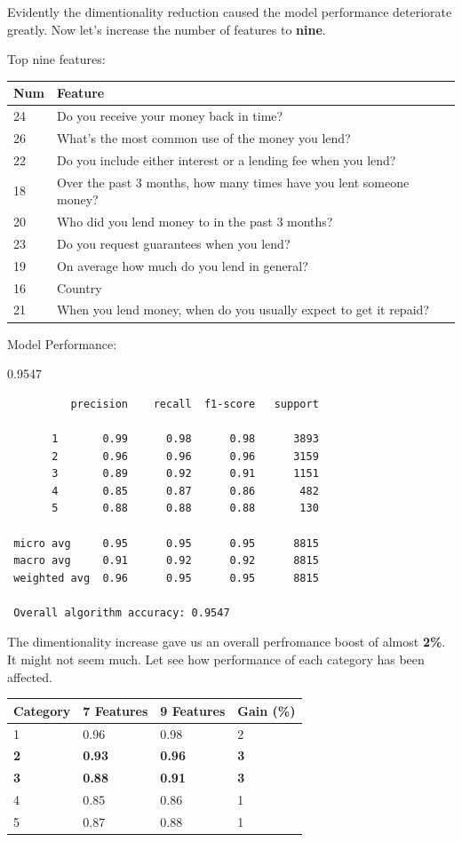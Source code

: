 Evidently the dimentionality reduction caused the model performance
deteriorate greatly. Now let's increase the number of features to
\textbf{nine}.

Top nine features:

\begin{longtable}[]{@{}ll@{}}
\toprule
Num & Feature\tabularnewline
\midrule
\endhead
24 & Do you receive your money back in time?\tabularnewline
26 & What's the most common use of the money you lend?\tabularnewline
22 & Do you include either interest or a lending fee when you
lend?\tabularnewline
18 & Over the past 3 months, how many times have you lent someone
money?\tabularnewline
20 & Who did you lend money to in the past 3 months?\tabularnewline
23 & Do you request guarantees when you lend?\tabularnewline
19 & On average how much do you lend in general?\tabularnewline
16 & Country\tabularnewline
21 & When you lend money, when do you usually expect to get it
repaid?\tabularnewline
\bottomrule
\end{longtable}

Model Performance:

0.9547

\begin{verbatim}
          precision    recall  f1-score   support

       1       0.99      0.98      0.98      3893
       2       0.96      0.96      0.96      3159
       3       0.89      0.92      0.91      1151
       4       0.85      0.87      0.86       482
       5       0.88      0.88      0.88       130

 micro avg     0.95      0.95      0.95      8815
 macro avg     0.91      0.92      0.92      8815
 weighted avg  0.96      0.95      0.95      8815
 
 Overall algorithm accuracy: 0.9547
\end{verbatim}

The dimentionality increase gave us an overall perfromance boost of
almost \textbf{2\%}. It might not seem much. Let see how performance of
each category has been affected.

\begin{longtable}[]{@{}llll@{}}
\toprule
Category & 7 Features & 9 Features & Gain (\%)\tabularnewline
\midrule
\endhead
1 & 0.96 & 0.98 & 2\tabularnewline
\textbf{2} & \textbf{0.93} & \textbf{0.96} & \textbf{3}\tabularnewline
\textbf{3} & \textbf{0.88} & \textbf{0.91} & \textbf{3}\tabularnewline
4 & 0.85 & 0.86 & 1\tabularnewline
5 & 0.87 & 0.88 & 1\tabularnewline
\bottomrule
\end{longtable}

